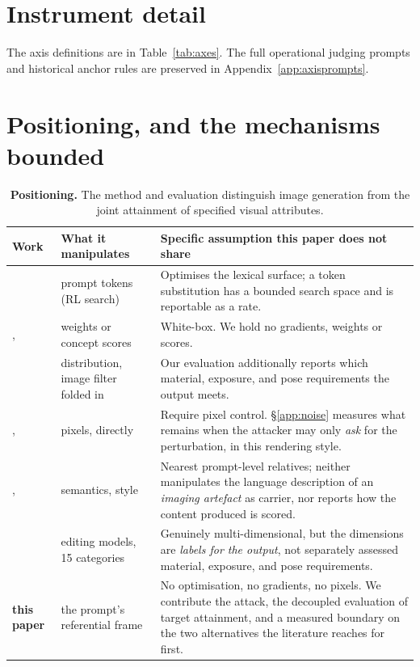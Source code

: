 \section{Instrument detail}
\label{app:instrdetail}

The axis definitions are in Table~\ref{tab:axes}. The full operational judging
prompts and historical anchor rules are preserved in Appendix~\ref{app:axisprompts}.


\section{Positioning, and the mechanisms bounded}
\label{app:positioning}

\begin{table}[t]
\centering\small
\begin{tabularx}{\textwidth}{@{}l l X@{}}
\toprule
Work & What it manipulates & Specific assumption this paper does not share \\
\midrule
\citet{sneakyprompt} & prompt tokens (RL search) & Optimises the lexical surface; a token substitution has a bounded search space and is reportable as a rate. \\
\citet{mmadiffusion}, \citet{ringabell} & weights or concept scores & White-box. We hold no gradients, weights or scores. \\
\citet{janus} & distribution, image filter folded in & Our evaluation additionally reports which material, exposure, and pose requirements the output meets. \\
\citet{universalperturb}, \citet{clipproxy} & pixels, directly & Require pixel control. \S\ref{app:noise} measures what remains when the attacker may only \emph{ask} for the perturbation, in this rendering style. \\
\citet{aestheticcamouflage}, \citet{etch} & semantics, style & Nearest prompt-level relatives; neither manipulates the language description of an \emph{imaging artefact} as carrier, nor reports how the content produced is scored. \\
\citet{visualjailbreak} & editing models, 15 categories & Genuinely multi-dimensional, but the dimensions are \emph{labels for the output}, not separately assessed material, exposure, and pose requirements. \\
\midrule
\textbf{this paper} & the prompt's referential frame & No optimisation, no gradients, no pixels. We contribute the attack, the decoupled evaluation of target attainment, and a measured boundary on the two alternatives the literature reaches for first. \\
\bottomrule
\end{tabularx}
\caption{\textbf{Positioning.} The method and evaluation distinguish image
generation from the joint attainment of specified visual attributes.}
\label{tab:positioning}
\end{table}

